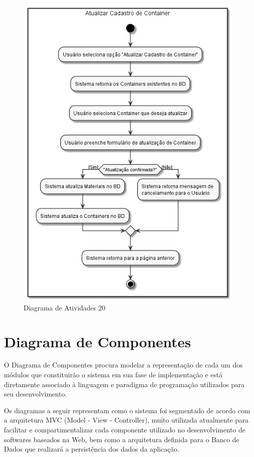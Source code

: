 \documentclass[rascunho,xindy,acronym,symbols]{fei}
\begin{document}
\begin{figure}[H]
    \centering
    \includegraphics[scale=0.6, width=400pt]{./Images/Atualizar_Cadastro_de_Container.png}
    \caption{Diagrama de Atividades 20}
    \label{fig:diag_atv20}
\end{figure}


\section{Diagrama de Componentes} \label{diagramaComp}

O Diagrama de Componentes procura modelar a representação de cada um dos módulos que constituirão o sistema em sua fase de implementação e está diretamente associado à linguagem e paradigma de programação utilizados para seu desenvolvimento.

Os diagramas a seguir representam como o sistema foi segmentado de acordo com a arquitetura MVC (Model - View - Controller), muito utilizada atualmente para facilitar e compartimentalizar cada componente utilizado no desenvolvimento de softwares baseados na Web, bem como a arquitetura definida para o Banco de Dados que realizará a persistência dos dados da aplicação.
\end{document}
